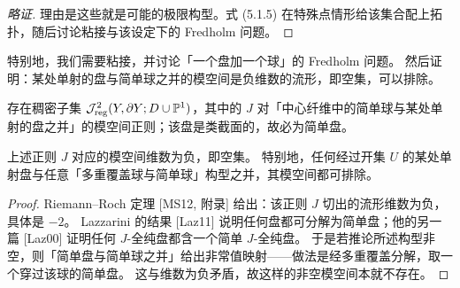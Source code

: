 
\begin{proof}[{略证}]
理由是这些就是可能的极限构型。式 (5.1.5) 在特殊点情形给该集合配上拓扑，随后讨论粘接与该设定下的 Fredholm 问题。
\end{proof}

特别地，我们需要粘接，并讨论「一个盘加一个球」的 Fredholm 问题。
然后证明：某处单射的盘与简单球之并的模空间是负维数的流形，即空集，可以排除。

\begin{lemma}[排除本文设定中的起泡]\label{c7:lem-excluding-bubbling}
存在稠密子集 $\mathcal{J}^2_{\mathrm{reg}}(Y,\partial Y;D\cup\mathbb{P}^1)$，其中的 $J$ 对「中心纤维中的简单球与某处单射的盘之并」的模空间正则；该盘是类截面的，故必为简单盘。
\end{lemma}

\begin{corollary}\label{c7:cor-no-bubbling}
上述正则 $J$ 对应的模空间维数为负，即空集。
特别地，任何经过开集 $U$ 的某处单射盘与任意「多重覆盖球与简单球」构型之并，其模空间都可排除。
\end{corollary}

\begin{proof}
Riemann--Roch 定理 [MS12, 附录] 给出：该正则 $J$ 切出的流形维数为负，具体是 $-2$。
Lazzarini 的结果 [Laz11] 说明任何盘都可分解为简单盘；他的另一篇 [Laz00] 证明任何 $J$-全纯盘都含一个简单 $J$-全纯盘。
于是若推论所述构型非空，则「简单盘与简单球之并」给出非常值映射——做法是经多重覆盖分解，取一个穿过该球的简单盘。
这与维数为负矛盾，故这样的非空模空间本就不存在。
\end{proof}

